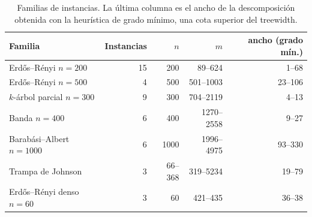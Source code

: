 \begin{table}[!htbp]\centering\small
\begin{tabular}{@{}lrrrr@{}}\toprule
Familia & Instancias & $n$ & $m$ & ancho (grado mín.) \\\midrule
Erdős–Rényi $n{=}200$ & 15 & 200 & 89--624 & 1--68 \\
Erdős–Rényi $n{=}500$ & 4 & 500 & 501--1003 & 23--106 \\
$k$-árbol parcial $n{=}300$ & 9 & 300 & 704--2119 & 4--13 \\
Banda $n{=}400$ & 6 & 400 & 1270--2558 & 9--27 \\
Barabási–Albert $n{=}1000$ & 6 & 1000 & 1996--4975 & 93--330 \\
Trampa de Johnson & 3 & 66--368 & 319--5234 & 19--79 \\
Erdős–Rényi denso $n{=}60$ & 3 & 60 & 421--435 & 36--38 \\
\bottomrule\end{tabular}
\caption{Familias de instancias. La última columna es el ancho de la descomposición obtenida con la heurística de grado mínimo, una cota superior del treewidth.}\label{tab:familias}\end{table}
